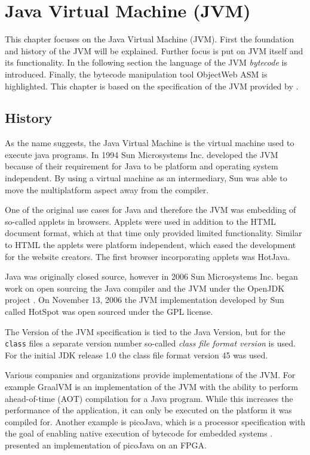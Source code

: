 \chapter{Java Virtual Machine (JVM)}

This chapter focuses on the Java Virtual Machine (JVM). First the foundation and history of the JVM will be explained. Further focus is put on JVM itself and its functionality. In the following section the language of the JVM \textit{bytecode} is introduced. Finally, the bytecode manipulation tool ObjectWeb ASM is highlighted. This chapter is based on the specification of the JVM provided by \textcite{JVMHistoryOracle}.

\section{History}

 As the name suggests, the Java Virtual Machine is the virtual machine used to execute java programs. In 1994 Sun Microsystems Inc. developed the JVM because of their requirement for Java to be platform and operating system independent. By using a virtual machine as an intermediary, Sun was able to move the multiplatform aspect away from the compiler. 

One of the original use cases for Java and therefore the JVM was embedding of so-called applets in browsers. Applets were used in addition to the HTML document format, which at that time only provided limited functionality. Similar to HTML the applets were platform independent, which eased the development for the website creators. The first browser incorporating applets was HotJava. 

Java was originally closed source, however in 2006 Sun Microsystems Inc. began work on open sourcing the Java compiler and the JVM under the OpenJDK project \parencite{SunOpenSourceJava}. On November 13, 2006 the JVM implementation developed by Sun called HotSpot was open sourced under the GPL license.

The Version of the JVM specification is tied to the Java Version, but for the \texttt{class} files a separate version number so-called \textit{class file format version} is used. For the initial JDK release 1.0 the class file format version 45 was used. 

Various companies and organizations provide implementations of the JVM. For example GraalVM is an implementation of the JVM with the ability to perform ahead-of-time (AOT) compilation for a Java program. While this increases the performance of the application, it can only be executed on the platform it was compiled for. Another example is picoJava, which is a processor specification with the goal of enabling native execution of bytecode for embedded systems \parencite{PicoJava}. \textcite{PicoJavaFPGA} presented an implementation of picoJava on an FPGA.




